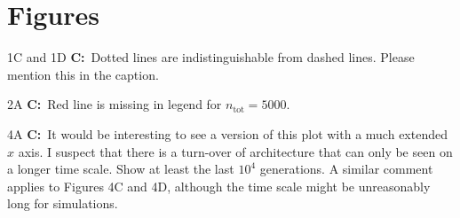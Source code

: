 \documentclass[11pt]{article}
\newenvironment{my_description}
{\begin{description}
  \setlength{\itemsep}{2pt}
  \setlength{\parskip}{0pt}
  \setlength{\parsep}{0pt}}
{\end{description}}
\newcommand{\C}{\textbf{C:}\ }
\begin{document}
\section{Figures}
\begin{my_description}
	\item[1C and 1D] \C Dotted lines are indistinguishable from dashed lines. Please mention this in the caption.
	\item[2A] \C Red line is missing in legend for $n_\mathrm{tot} = 5000$.
	\item[4A] \C It would be interesting to see a version of this plot with a much extended $x$ axis. I suspect that there is a turn-over of architecture that can only be seen on a longer time scale. Show at least the last $10^4$ generations. A similar comment applies to Figures 4C and 4D, although the time scale might be unreasonably long for simulations.
\end{my_description}




\end{document}
